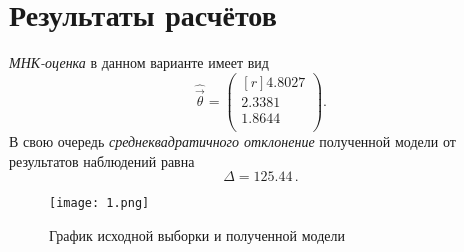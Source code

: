 \section{Результаты расчётов}
\emph{МНК-оценка} в данном варианте имеет вид
\begin{equation}
    \hat{\vec{\theta}} = \begin{pmatrix*}[r]
        4.8027 \\
        2.3381 \\
        1.8644 \\
    \end{pmatrix*}.
\end{equation}
В свою очередь \emph{среднеквадратичного отклонение} полученной модели от результатов наблюдений равна
\begin{equation}
    \Delta = 125.44\,.
\end{equation}

\begin{figure}[h]
    \centering
    \texttt{[image: 1.png]}
    \caption{График исходной выборки и полученной модели}
\end{figure}